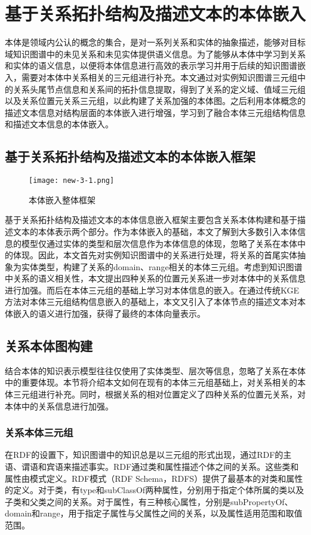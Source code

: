 \chapter{基于关系拓扑结构及描述文本的本体嵌入}
本体是领域内公认的概念的集合，是对一系列关系和实体的抽象描述，能够对目标域知识图谱中的未见关系和未见实体提供语义信息。为了能够从本体中学习到关系和实体的语义信息，以便将本体信息进行高效的表示学习并用于后续的知识图谱嵌入，需要对本体中关系相关的三元组进行补充。本文通过对实例知识图谱三元组中的关系头尾节点信息和关系间的拓扑信息提取，得到了关系的定义域、值域三元组以及关系位置元关系三元组，以此构建了关系加强的本体图。之后利用本体概念的描述文本信息对结构层面的本体嵌入进行增强，学习到了融合本体三元组结构信息和描述文本信息的本体嵌入。

\section{基于关系拓扑结构及描述文本的本体嵌入框架}
\begin{figure}[h]
  \centering
  \texttt{[image: new-3-1.png]}
  \caption{本体嵌入整体框架}
  \label{fig:new-3-1}
\end{figure}

基于关系拓扑结构及描述文本的本体信息嵌入框架主要包含关系本体构建和基于描述文本的本体表示两个部分。作为本体嵌入的基础，本文了解到大多数引入本体信息的模型仅通过实体的类型和层次信息作为本体信息的体现，忽略了关系在本体中的体现。因此，本文首先对实例知识图谱中的关系进行处理，将关系的首尾实体抽象为实体类型，构建了关系的domain、range相关的本体三元组。考虑到知识图谱中关系的语义相关性，本文提出四种关系的位置元关系进一步对本体中的关系信息进行加强。而后在本体三元组的基础上学习对本体信息的嵌入。在通过传统KGE方法对本体三元组结构信息嵌入的基础上，本文又引入了本体节点的描述文本对本体嵌入的语义进行加强，获得了最终的本体向量表示。

\section{关系本体图构建}
结合本体的知识表示模型往往仅使用了实体类型、层次等信息，忽略了关系在本体中的重要体现。本节将介绍本文如何在现有的本体三元组基础上，对关系相关的本体三元组进行补充。同时，根据关系的相对位置定义了四种关系的位置元关系，对本体中的关系信息进行加强。

\subsection{关系本体三元组}
在RDF的设置下，知识图谱中的知识总是以三元组的形式出现，通过RDF的主语、谓语和宾语来描述事实。RDF通过类和属性描述个体之间的关系。这些类和属性由模式定义。RDF模式（RDF Schema，RDFS）提供了最基本的对类和属性的定义。对于类，有type和subClassOf两种属性，分别用于指定个体所属的类以及子类和父类之间的关系。对于属性，有三种核心属性，分别是subPropertyOf、domain和range，用于指定子属性与父属性之间的关系，以及属性适用范围和取值范围。

